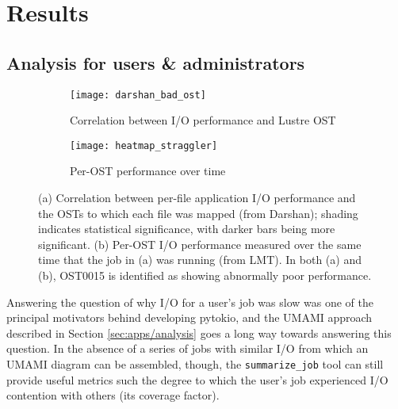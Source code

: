 \section{Results} \label{sec:results}


\subsection{Analysis for users \& administrators} \label{sec:results/users}

\begin{figure}
    \centering
    \begin{subfigure}{0.55\textwidth}
    	\texttt{[image: darshan\_bad\_ost]}
        \caption{Correlation between I/O performance and Lustre OST}
        \label{fig:stragging-ost/correlation}
    \end{subfigure}
    \begin{subfigure}{0.55\textwidth}
    	\texttt{[image: heatmap\_straggler]}
        \caption{Per-OST performance over time}
        \label{fig:stragging-ost/heatmap}
    \end{subfigure}
    \caption{(a) Correlation between per-file application I/O performance and the OSTs to which each file was mapped (from Darshan); shading indicates statistical significance, with darker bars being more significant.
    (b) Per-OST I/O performance measured over the same time that the job in (a) was running (from LMT).
    In both (a) and (b), OST0015 is identified as showing abnormally poor performance.
    }
    \label{fig:straggling-ost}
    \vspace{-.2in}
\end{figure}

Answering the question of why I/O for a user's job was slow was one of the principal motivators behind developing pytokio, and the UMAMI approach described in Section \ref{sec:apps/analysis} goes a long way towards answering this question.
In the absence of a series of jobs with similar I/O from which an UMAMI diagram can be assembled, though, the \texttt{summarize\_job} tool can still provide useful metrics such the degree to which the user's job experienced I/O contention with others (its coverage factor).

